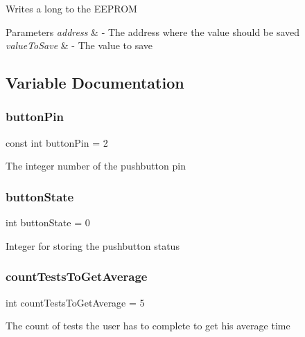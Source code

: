Writes a long to the E\+E\+P\+R\+OM 
\begin{DoxyParams}{Parameters}
{\em address} & -\/ The address where the value should be saved \\
\hline
{\em value\+To\+Save} & -\/ The value to save \\
\hline
\end{DoxyParams}


\subsection{Variable Documentation}
\mbox{\label{test_8ino_a4ddb8b6ae564eb22f7c74f2683a63b8e}} 
\subsubsection{\texorpdfstring{buttonPin}{buttonPin}}
{\footnotesize\ttfamily const int button\+Pin = 2}

The integer number of the pushbutton pin \mbox{\label{test_8ino_a5002611f83f5a861df12917dd5651db8}} 
\subsubsection{\texorpdfstring{buttonState}{buttonState}}
{\footnotesize\ttfamily int button\+State = 0}

Integer for storing the pushbutton status \mbox{\label{test_8ino_a24ea86697f33c3769f06300cc30b6cf3}} 
\subsubsection{\texorpdfstring{countTestsToGetAverage}{countTestsToGetAverage}}
{\footnotesize\ttfamily int count\+Tests\+To\+Get\+Average = 5}

The count of tests the user has to complete to get his average time \mbox{\label{test_8ino_ae60621cb69fbfeb47e82e766ed90c581}} 
